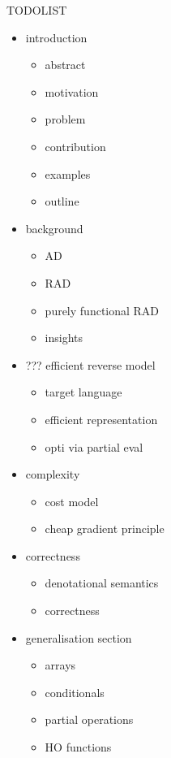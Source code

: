 \begin{center}
    \huge TODOLIST
\end{center}
\begin{itemize}
    \item introduction
    \begin{itemize}
        \item abstract
        \item motivation
        \item problem
        \item contribution
        \item examples
        \item outline
    \end{itemize}
    \item background
    \begin{itemize}
        \item AD
        \item RAD
        \item purely functional RAD
        \item insights
    \end{itemize}
    \item ??? efficient reverse model
    \begin{itemize}
        \item target language
        \item efficient representation
        \item opti via partial eval
    \end{itemize}
    \item complexity
    \begin{itemize}
        \item cost model
        \item cheap gradient principle
    \end{itemize}
    \item correctness
    \begin{itemize}
        \item denotational semantics
        \item correctness
    \end{itemize}
    \item generalisation section
    \begin{itemize}
        \item arrays
        \item conditionals
        \item partial operations
        \item HO functions

\end{itemize}
\end{itemize}

